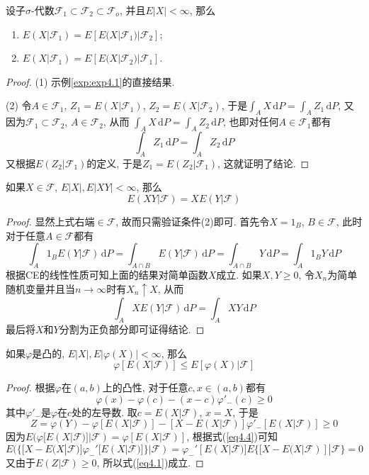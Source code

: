 \documentclass[cn, 12pt, math=mtpro2, bibstyle=apa, blue, twocol]{elegantbook}
\newcommand{\F}{\mathcal{F}}
\begin{document}
\begin{theorem}\label{thm:thm4.2}
  设子$\sigma$-代数$\F_1\subset\F_2\subset\F_o$, 并且$E|X|<\infty$, 那么
  \begin{enumerate}[label=(\arabic*)]
    \item $E(X|\F_1)=E[E(X|\F_1)|\F_2]$;
    \item $E(X|\F_1)=E[E(X|\F_2)|\F_1]$.
  \end{enumerate}
\end{theorem}
\begin{proof}
  (1) 示例\ref{exp:exp4.1}的直接结果.

  (2) 令$A\in\F_1$, $Z_1=E(X|\F_1)$, $Z_2=E(X|\F_2)$, 于是$\int_AX\,\text{d}P=\int_AZ_1\,\text{d}P$,
  又因为$\F_1\subset\F_2$, $A\in\F_2$, 从而
  $\int_AX\,\text{d}P=\int_AZ_2\,\text{d}P$, 也即对任何$A\in\F_1$都有
  $$\int_AZ_1\,\text{d}P=\int_AZ_2\,\text{d}P$$
  又根据$E(Z_2|\F_1)$的定义, 于是$Z_1=E(Z_2|\F_1)$, 这就证明了结论.
\end{proof}

\begin{theorem}\label{thm:thm4.3}
  如果$X\in\F$, $E|X|, E|XY|<\infty$, 那么
  \begin{equation}\label{eq4.4}
    E(XY|\F)=XE(Y|\F)
  \end{equation}
\end{theorem}
\begin{proof}
  显然上式右端$\in\F$, 故而只需验证条件(2)即可. 首先令$X=1_B$, $B\in\F$, 此时对于任意$A\in\F$都有
  $$\int_A1_BE(Y|\F)\,\text{d}P=\int_{A\cap B}E(Y|\F)\,\text{d}P=\int_{A\cap B}Y\,\text{d}P=\int_A1_BY\,\text{d}P$$
  根据CE的线性性质可知上面的结果对简单函数$X$成立. 如果$X,Y\geq0$, 令$X_n$为简单随机变量并且当$n\to\infty$时有$X_n\uparrow X$, 从而
  $$\int_AXE(Y|\F)\,\text{d}P=\int_AXY\,\text{d}P$$
  最后将$X$和$Y$分割为正负部分即可证得结论.
\end{proof}

\begin{theorem}[Jensen不等式]
  如果$\varphi$是凸的, $E|X|, E|\varphi(X)|<\infty$, 那么
  \begin{equation}\label{eq4.1}
    \varphi[E(X|\F)]\leq E[\varphi(X)|\F]
  \end{equation}
\end{theorem}
\begin{proof}
  根据$\varphi$在$(a,b)$上的凸性, 对于任意$c, x\in(a,b)$都有
  \begin{equation}\label{eq4.2}
    \varphi(x)-\varphi(c)-(x-c)\varphi'_{-}(c)\ge0
  \end{equation}
  其中$\varphi'_{-}$是$\varphi$在$c$处的左导数. 取$c=E(X|\F)$, $x=X$, 于是
  \begin{equation}\label{eq4.3}
    Z=\varphi(Y)-\varphi[E(X|\F)]-[X-E(X|\F)]\varphi'_{-}[E(X|\F)]\ge0
  \end{equation}
  因为$E(\varphi[E(X|\F)]|\F)=\varphi[E(X|\F)]$, 根据式(\ref{eq4.4})可知
  $$E(\{[X-E(X|\F)]\varphi_{-}'[E(X|\F)]\}|\F)=\varphi_{-}'[E(X|\F)]E\{[X-E(X|\F)]|\F\}=0$$
  又由于$E(Z|\F)\ge0$, 所以式(\ref{eq4.1})成立.
\end{proof}
\end{document}

